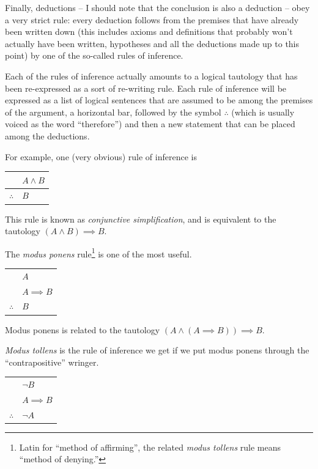 Finally, deductions -- I should note that the conclusion is also a 
deduction -- obey a very strict rule: every deduction follows from
the premises that have already been written down (this includes
axioms and definitions that probably won't actually have been written,
hypotheses and all the deductions made up to this point) by one of the 
so-called rules of inference.

Each of the rules of inference actually amounts to a logical tautology
that has been re-expressed as a sort of re-writing rule.   Each rule
of inference will be expressed as a list of logical 
sentences that are assumed to be among the premises of the argument, 
a horizontal bar, followed by the symbol $\therefore$ (which is
usually voiced as the word ``therefore'') and then a new statement 
that can be placed among the deductions.

For example, one (very obvious) rule of inference is

\begin{center}
\begin{tabular}{cl}
 & $A \land B$ \\ \hline
$\therefore$ & $B$\\
\end{tabular}
\end{center}
  
\noindent This rule is known as 
\emph{conjunctive simplification}, and
is equivalent to the tautology $(A \land B) \implies B$. 

The \emph{modus ponens} 
rule\footnote{Latin for ``method of affirming'',
the related \emph{modus tollens} rule means ``method of denying.''} 
is one of the most useful.

\begin{center}
\begin{tabular}{cl}
 & $A$ \\
 & $A \implies B$ \\ \hline
$\therefore$ & $B$ \\
\end{tabular}
\end{center}

Modus ponens is related to the tautology $(A \land (A \implies B)) \implies B$.

\emph{Modus tollens} 
is the rule of inference we get if we put modus ponens 
through the ``contrapositive'' wringer.

\begin{center}
\begin{tabular}{cl}
 & ${\lnot}B$ \\
 & $A \implies B$ \\ \hline
$\therefore$ & ${\lnot}A$ \\
\end{tabular}
\end{center}

